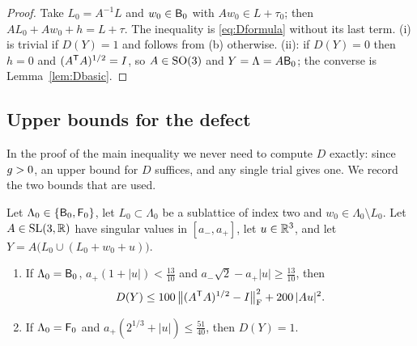 \begin{proof}
Take $L_0=A^{-1}L$ and $w_0\in\mathsf B_0$ with $Aw_0\in L+\tau_0$; then $AL_0+Aw_0+h=L+\tau$. The inequality is \eqref{eq:Dformula} without its
last term. (i) is trivial if $D(Y)=1$ and follows from (b) otherwise. (ii): if $D(Y)=0$ then $h=0$ and $(A^\mathsf T A)^{1/2}=I$, so
$A\in\mathrm{SO}(3)$ and $Y=\Lambda=A\mathsf B_0$; the converse is Lemma~\ref{lem:Dbasic}.
\end{proof}

\subsection{Upper bounds for the defect}\label{ssec:Dupper}

In the proof of the main inequality we never need to compute $D$ exactly: since $g>0$, an upper bound for $D$ suffices, and any
single trial gives one. We record the two bounds that are used.

\begin{lemma}\label{lem:Dupper}
Let $\Lambda_0\in\{\mathsf B_0,\mathsf F_0\}$, let $L_0\subset\Lambda_0$ be a sublattice of index two and $w_0\in\Lambda_0\setminus L_0$. Let
$A\in\mathrm{SL}(3,\mathbb R)$ have singular values in $[a_-,a_+]$, let $u\in\mathbb R^3$, and let $Y=A\bigl(L_0\cup(L_0+w_0+u)\bigr)$.
\begin{enumerate}
\item[\textup{(i)}] If $\Lambda_0=\mathsf B_0$, $a_+(1+|u|)<\frac{13}{10}$ and $a_-\sqrt2-a_+|u|\ge\frac{13}{10}$, then
\begin{equation}\label{eq:Dq}
  D(Y)\le100\,\bigl\|(A^\mathsf T A)^{1/2}-I\bigr\|_\mathrm F^2+200\,|Au|^2 .
\end{equation}
\item[\textup{(ii)}] If $\Lambda_0=\mathsf F_0$ and $a_+(2^{1/3}+|u|)\le\frac{51}{40}$, then $D(Y)=1$.
\end{enumerate}
\end{lemma}

